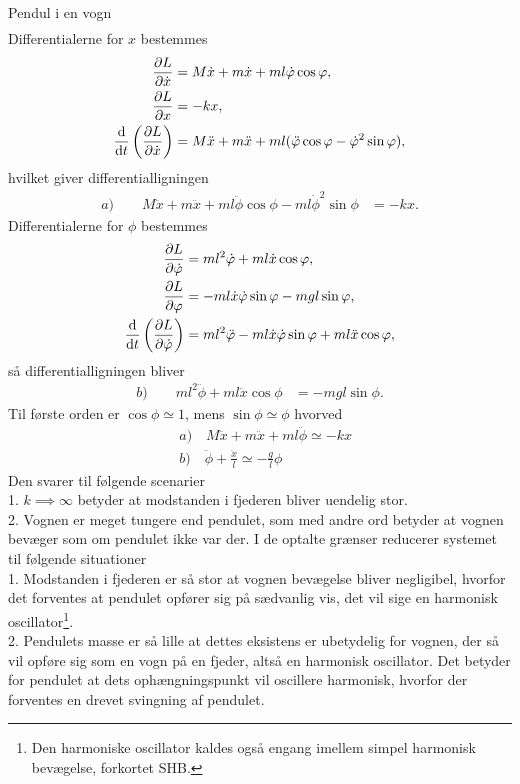 \documentclass[crop=false, class=memoir]{standalone}
\begin{document}
\begin{opgave}[4]{Pendul i en vogn}
\begin{align*}
\end{align*}
%
\opg Differentialerne  for $x$ bestemmes
%
\begin{align*}
	\pdv{L}{\dot{x}} &= M\dot{x}+ m\dot{x} + ml\dot{\varphi}\cos\varphi, \\
	\pdv{L}{x} &= -kx,\\
	\dv{}{t}\left(\pdv{L}{\dot{x}}\right) &= M\ddot{x}+ m\ddot{x} + ml(\ddot{\varphi}\cos\varphi - \dot{\varphi}^2\sin\varphi),
\end{align*}
%
hvilket giver differentialligningen
%
\begin{align*}
	a) \qquad M\ddot{x} + m\ddot{x} + ml\ddot{\phi}\cos\phi - ml\dot{\phi}^2\sin\phi &= -kx.
\end{align*}
%
Differentialerne for $\phi$ bestemmes
%
\begin{align*}
	\pdv{L}{\dot{\varphi}} &= ml^2\dot{\varphi} + ml\dot{x}\cos\varphi, \\
	\pdv{L}{\varphi} &= -ml\dot{x}\dot{\varphi}\sin\varphi - mgl\sin\varphi,\\
	\dv{}{t}\left(\pdv{L}{\dot{\varphi}}\right) &= ml^2\ddot{\varphi} - ml\dot{x}\dot{\varphi}\sin\varphi + ml\ddot{x}\cos\varphi,
\end{align*}
%
så differentialligningen bliver
%
\begin{align*}
	b) \qquad ml^2\ddot{\phi} + ml\ddot{x}\cos\phi &= -mgl\sin\phi.
\end{align*}
%
\opg Til første orden er $\cos\phi \simeq 1$, mens $\sin\phi \simeq \phi$ hvorved
%
\begin{align*}
    &a) \quad M\ddot{x} + m\ddot{x} +ml\ddot{\phi} \simeq -kx \\
    &b) \quad \ddot{\phi} + \frac{\ddot{x}}{l} \simeq -\frac{g}{l}\phi
\end{align*}
%
\opg Den svarer til følgende scenarier \\
%
1. \quad $k \implies \infty$ betyder at modstanden i fjederen bliver uendelig stor. \\
2. \quad Vognen er meget tungere end pendulet, som med andre ord betyder at vognen bevæger som om pendulet ikke var der.
%
\opg I de optalte grænser reducerer systemet til følgende situationer \\
%
1. \quad Modstanden i fjederen er så stor at vognen bevægelse bliver negligibel, hvorfor det forventes at pendulet opfører sig på sædvanlig vis, det vil sige en harmonisk oscillator\footnote{Den harmoniske oscillator kaldes også engang imellem simpel harmonisk bevægelse, forkortet SHB.}. \\
%
2. \quad Pendulets masse er så lille at dettes eksistens er ubetydelig for vognen, der så vil opføre sig som en vogn på en fjeder, altså en harmonisk oscillator. Det betyder for pendulet at dets ophængningspunkt vil oscillere harmonisk, hvorfor der forventes en drevet svingning af pendulet.

\end{opgave}
\end{document}
